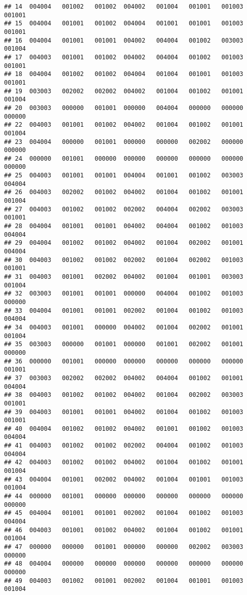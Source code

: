 \documentclass[
]{article}
\begin{document}
\begin{verbatim}
## 14  004004   001002   001002  004002   001004   001001   001003   001001
## 15  004004   001001   001002  004004   001001   001001   001003   001001
## 16  004004   001001   001001  004002   004004   001002   003003   001004
## 17  004003   001001   001002  004002   004004   001002   001003   001001
## 18  004004   001002   001002  004004   001004   001001   001003   001001
## 19  003003   002002   002002  004002   001004   001002   001001   001004
## 20  003003   000000   001001  000000   004004   000000   000000   000000
## 22  004003   001001   001002  004002   001004   001002   001001   001004
## 23  004004   000000   001001  000000   000000   002002   000000   000000
## 24  000000   001001   000000  000000   000000   000000   000000   000000
## 25  004003   001001   001001  004004   001001   001002   003003   004004
## 26  004003   002002   001002  004002   001004   001002   001001   001004
## 27  004003   001002   001002  002002   004004   002002   003003   001001
## 28  004004   001001   001001  004002   004004   001002   001003   004004
## 29  004004   001002   001002  004002   001004   002002   001001   004004
## 30  004003   001002   001002  002002   001004   002002   001003   001001
## 31  004003   001001   002002  004002   001004   001001   003003   001004
## 32  003003   001001   001001  000000   004004   001002   001003   000000
## 33  004004   001001   001001  002002   001004   001002   001003   004004
## 34  004003   001001   000000  004002   001004   002002   001001   001004
## 35  003003   000000   001001  000000   001001   002002   001001   000000
## 36  000000   001001   000000  000000   000000   000000   000000   001001
## 37  003003   002002   002002  004002   004004   001002   001001   004004
## 38  004003   001002   001002  004002   001004   002002   003003   001001
## 39  004003   001001   001001  004002   001004   001002   001003   001001
## 40  004004   001002   001002  004002   001001   001002   001003   004004
## 41  004003   001002   001002  002002   004004   001002   001003   004004
## 42  004003   001002   001002  004002   001004   001002   001001   001004
## 43  004004   001001   002002  004002   001004   001001   001003   001004
## 44  000000   001001   000000  000000   000000   000000   000000   000000
## 45  004004   001001   001001  002002   001004   001002   001003   004004
## 46  004003   001001   001002  004002   001004   001002   001001   001004
## 47  000000   000000   001001  000000   000000   002002   003003   000000
## 48  004004   000000   000000  000000   000000   000000   000000   000000
## 49  004003   001002   001001  002002   001004   001001   001003   001004

\end{verbatim}
\end{document}
